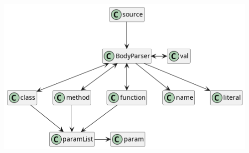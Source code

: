 \begin{frame}[fragile]
\begin{overprint}
    \includegraphics[width=0.96\textwidth]{img/parser-structure.png}
  \end{overprint}
\end{frame}

